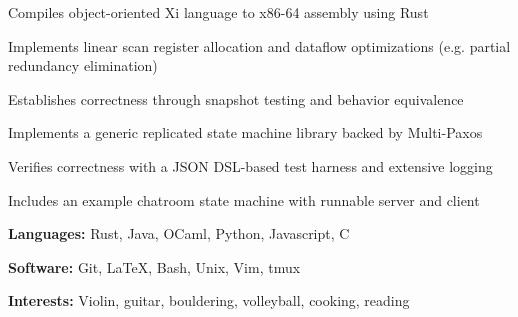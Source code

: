 \documentclass{resume}
\begin{document}
\begin{projects}
    \begin{description}
        \item Compiles object-oriented Xi language to x86-64 assembly using Rust
        \item Implements linear scan register allocation and dataflow optimizations (e.g. partial redundancy elimination)
        \item Establishes correctness through snapshot testing and behavior equivalence
    \end{description}

    \begin{description}
        \item Implements a generic replicated state machine library backed by Multi-Paxos
        \item Verifies correctness with a JSON DSL-based test harness and extensive logging
        \item Includes an example chatroom state machine with runnable server and client
    \end{description}
\end{projects}

\begin{skills}
    \begin{description}
        \item \textbf{Languages:} Rust, Java, OCaml, Python, Javascript, C
        \item \textbf{Software:} Git, LaTeX, Bash, Unix, Vim, tmux
        \item \textbf{Interests:} Violin, guitar, bouldering, volleyball, cooking, reading
    \end{description}
\end{skills}
\end{document}
